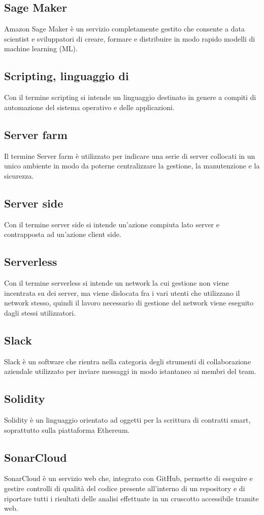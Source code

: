 \subsection{Sage Maker} Amazon Sage Maker è un servizio completamente gestito che consente a data scientist e sviluppatori di creare, formare e distribuire in modo rapido modelli di machine learning (ML). 
\subsection{Scripting, linguaggio di}  Con il termine scripting si intende un linguaggio destinato in genere a compiti di automazione del sistema operativo e delle applicazioni.
\subsection{Server farm} Il termine Server farm è utilizzato per indicare una serie di server collocati in un unico ambiente in modo da poterne centralizzare la gestione, la manutenzione e la sicurezza.
\subsection{Server side} Con il termine server side si intende un'azione compiuta lato server e contrapposta ad un'azione client side.
\subsection{Serverless} Con il termine serverless si intende un network la cui gestione non viene incentrata su dei server, ma viene dislocata fra i vari utenti che utilizzano il network stesso, quindi il lavoro necessario di gestione del network viene eseguito dagli stessi utilizzatori.
\subsection{Slack} Slack è un software che rientra nella categoria degli strumenti di collaborazione aziendale utilizzato per inviare messaggi in modo istantaneo ai membri del team.
\subsection{Solidity} Solidity è un linguaggio orientato ad oggetti per la scrittura di contratti smart, soprattutto sulla piattaforma Ethereum.
\subsection{SonarCloud} SonarCloud è un servizio web che, integrato con GitHub, permette di eseguire e gestire controlli di qualità del codice presente all'interno di un repository e di riportare tutti i risultati delle analisi effettuate in un cruscotto accessibile tramite web.

